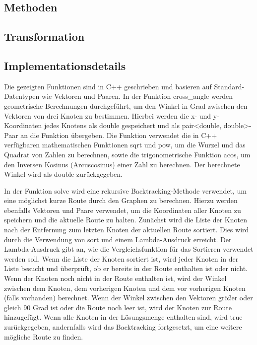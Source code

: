 \documentclass[a4paper,10pt,ngerman]{scrartcl}
\begin{document}
    \subsection{Methoden}\label{subsec:methoden}
    \subsection{Transformation}\label{subsec:transformation}
    \subsection{Implementationsdetails}\label{subsec:implementationsdetails}
    Die gezeigten Funktionen sind in C++ geschrieben und basieren auf Standard-Datentypen wie Vektoren und Paaren.
    In der Funktion cross\_angle werden geometrische Berechnungen durchgeführt, um den Winkel in Grad zwischen den Vektoren von drei Knoten zu bestimmen.
    Hierbei werden die x- und y-Koordinaten jedes Knotens als double gespeichert und als pair<double, double>-Paar an die Funktion übergeben.
    Die Funktion verwendet die in C++ verfügbaren mathematischen Funktionen sqrt und pow, um die Wurzel und das Quadrat von Zahlen zu berechnen,
    sowie die trigonometrische Funktion acos, um den Inversen Kosinus (Arcuscosinus) einer Zahl zu berechnen.
    Der berechnete Winkel wird als double zurückgegeben.

    In der Funktion solve wird eine rekursive Backtracking-Methode verwendet, um eine möglichst kurze Route durch den Graphen zu berechnen.
    Hierzu werden ebenfalls Vektoren und Paare verwendet, um die Koordinaten aller Knoten zu speichern und die aktuelle Route zu halten.
    Zunächst wird die Liste der Knoten nach der Entfernung zum letzten Knoten der aktuellen Route sortiert.
    Dies wird durch die Verwendung von sort und einem Lambda-Ausdruck erreicht.
    Der Lambda-Ausdruck gibt an, wie die Vergleichsfunktion für das Sortieren verwendet werden soll.
    Wenn die Liste der Knoten sortiert ist, wird jeder Knoten in der Liste besucht und überprüft, ob er bereits in der Route enthalten ist oder nicht.
    Wenn der Knoten noch nicht in der Route enthalten ist, wird der Winkel zwischen dem Knoten, dem vorherigen Knoten und dem vor vorherigen Knoten (falls vorhanden) berechnet.
    Wenn der Winkel zwischen den Vektoren größer oder gleich 90 Grad ist oder die Route noch leer ist, wird der Knoten zur Route hinzugefügt.
    Wenn alle Knoten in der Lösungsmenge enthalten sind, wird true zurückgegeben, andernfalls wird das Backtracking fortgesetzt, um eine weitere mögliche Route zu finden.
\end{document}
